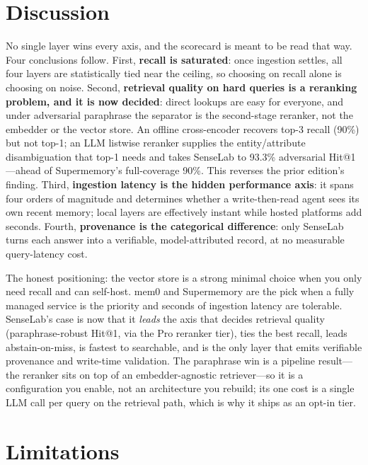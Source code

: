 \documentclass[11pt]{article}
\begin{document}
\section{Discussion}

No single layer wins every axis, and the scorecard is meant to be read that way. Four conclusions follow.
First, \textbf{recall is saturated}: once ingestion settles, all four layers are statistically tied near
the ceiling, so choosing on recall alone is choosing on noise. Second, \textbf{retrieval quality on hard
queries is a reranking problem, and it is now decided}: direct lookups are easy for everyone, and under
adversarial paraphrase the separator is the second-stage reranker, not the embedder or the vector store.
An offline cross-encoder recovers top-3 recall (90\%) but not top-1; an LLM listwise reranker supplies
the entity/attribute disambiguation that top-1 needs and takes SenseLab to 93.3\% adversarial
Hit@1---ahead of Supermemory's full-coverage 90\%. This reverses the prior edition's finding. Third,
\textbf{ingestion latency is the hidden performance axis}: it spans four orders of magnitude and
determines whether a write-then-read agent sees its own recent memory; local layers are effectively
instant while hosted platforms add seconds. Fourth, \textbf{provenance is the categorical difference}:
only SenseLab turns each answer into a verifiable, model-attributed record, at no measurable
query-latency cost.

The honest positioning: the vector store is a strong minimal choice when you only need recall and can
self-host. mem0 and Supermemory are the pick when a fully managed service is the priority and seconds of
ingestion latency are tolerable. SenseLab's case is now that it \emph{leads} the axis that decides
retrieval quality (paraphrase-robust Hit@1, via the Pro reranker tier), ties the best recall, leads
abstain-on-miss, is fastest to searchable, and is the only layer that emits verifiable provenance and
write-time validation. The paraphrase win is a pipeline result---the reranker sits on top of an
embedder-agnostic retriever---so it is a configuration you enable, not an architecture you rebuild; its
one cost is a single LLM call per query on the retrieval path, which is why it ships as an opt-in tier.

\section{Limitations}
\end{document}
